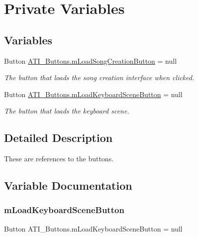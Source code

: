 \hypertarget{group___a_t_i_buttons_priv_var}{}\section{Private Variables}
\label{group___a_t_i_buttons_priv_var}
\subsection*{Variables}
\begin{DoxyCompactItemize}
\item 
Button \hyperlink{group___a_t_i_buttons_priv_var_ga8ab732143834bd94387cfd94c59886da}{A\+T\+I\+\_\+\+Buttons.\+m\+Load\+Song\+Creation\+Button} = null
\begin{DoxyCompactList}\small\item\em The button that loads the song creation interface when clicked. \end{DoxyCompactList}\item 
Button \hyperlink{group___a_t_i_buttons_priv_var_ga7b2f643a87f99b6a35a2d64330c8a9d4}{A\+T\+I\+\_\+\+Buttons.\+m\+Load\+Keyboard\+Scene\+Button} = null
\begin{DoxyCompactList}\small\item\em The button that loads the keyboard scene. \end{DoxyCompactList}\end{DoxyCompactItemize}


\subsection{Detailed Description}
These are references to the buttons. 

\subsection{Variable Documentation}
\mbox{\label{group___a_t_i_buttons_priv_var_ga7b2f643a87f99b6a35a2d64330c8a9d4}} 
\subsubsection{\texorpdfstring{m\+Load\+Keyboard\+Scene\+Button}{mLoadKeyboardSceneButton}}
{\footnotesize\ttfamily Button A\+T\+I\+\_\+\+Buttons.\+m\+Load\+Keyboard\+Scene\+Button = null\hspace{0.3cm}{\ttfamily [private]}}



